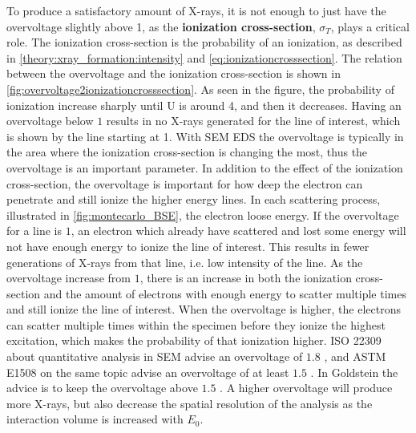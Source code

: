 To produce a satisfactory amount of X-rays, it is not enough to just have the overvoltage slightly above 1, as the \textbf{ionization cross-section}, $\sigma_T$, plays a critical role.
The ionization cross-section is the probability of an ionization, as described in \cref{theory:xray_formation:intensity} and \cref{eq:ionizationcrosssection}.
The relation between the overvoltage and the ionization cross-section is shown in \cref{fig:overvoltage2ionizationcrosssection}.
As seen in the figure, the probability of ionization increase sharply until U is around 4, and then it decreases.
Having an overvoltage below $1$ results in no X-rays generated for the line of interest, which is shown by the line starting at 1.
With SEM EDS the overvoltage is typically in the area where the ionization cross-section is changing the most, thus the overvoltage is an important parameter.
In addition to the effect of the ionization cross-section, the overvoltage is important for how deep the electron can penetrate and still ionize the higher energy lines.
In each scattering process, illustrated in \cref{fig:montecarlo_BSE}, the electron loose energy.
If the overvoltage for a line is $1$, an electron which already have scattered and lost some energy will not have enough energy to ionize the line of interest.
This results in fewer generations of X-rays from that line, i.e. low intensity of the line.
As the overvoltage increase from $1$, there is an increase in both the ionization cross-section and the amount of electrons with enough energy to scatter multiple times and still ionize the line of interest.
When the overvoltage is higher, the electrons can scatter multiple times within the specimen before they ionize the highest excitation, which makes the probability of that ionization higher.
ISO 22309 about quantitative analysis in SEM advise an overvoltage of $1.8$ \cite{iso_emsa_22029}, and ASTM E1508 on the same topic advise an overvoltage of at least $1.5$ \cite{astm_e1508_eds_quantification}.
In Goldstein the advice is to keep the overvoltage above $1.5$ \cite[Ch. 20.2.2]{goldstein_scanning_2018}.
A higher overvoltage will produce more X-rays, but also decrease the spatial resolution of the analysis as the interaction volume is increased with $E_0$. %


